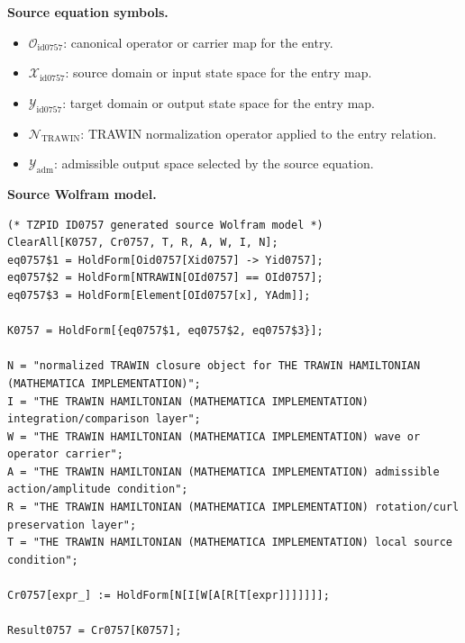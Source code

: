 \begin{minipage}[t]{0.49\linewidth}
\begingroup
\small
\raggedright
\textbf{Source equation symbols.}\par
\begin{itemize}[leftmargin=1.35em,itemsep=1pt,topsep=1pt,parsep=0pt]
    \item $\mathcal{O}_{\mathrm{id0757}}$: canonical operator or carrier map for the entry.
    \item $\mathcal{X}_{\mathrm{id0757}}$: source domain or input state space for the entry map.
    \item $\mathcal{Y}_{\mathrm{id0757}}$: target domain or output state space for the entry map.
    \item $\mathcal{N}_{\mathrm{TRAWIN}}$: TRAWIN normalization operator applied to the entry relation.
    \item $\mathcal{Y}_{\mathrm{adm}}$: admissible output space selected by the source equation.
\end{itemize}
\endgroup
\end{minipage}\hfill
\begin{minipage}[t]{0.47\linewidth}
\begingroup
\scriptsize
\raggedright
\textbf{Source Wolfram model.}\par
\begin{Verbatim}[fontsize=\tiny,breaklines=true,breakanywhere=true]
(* TZPID ID0757 generated source Wolfram model *)
ClearAll[K0757, Cr0757, T, R, A, W, I, N];
eq0757$1 = HoldForm[Oid0757[Xid0757] -> Yid0757];
eq0757$2 = HoldForm[NTRAWIN[OId0757] == OId0757];
eq0757$3 = HoldForm[Element[OId0757[x], YAdm]];

K0757 = HoldForm[{eq0757$1, eq0757$2, eq0757$3}];

N = "normalized TRAWIN closure object for THE TRAWIN HAMILTONIAN (MATHEMATICA IMPLEMENTATION)";
I = "THE TRAWIN HAMILTONIAN (MATHEMATICA IMPLEMENTATION) integration/comparison layer";
W = "THE TRAWIN HAMILTONIAN (MATHEMATICA IMPLEMENTATION) wave or operator carrier";
A = "THE TRAWIN HAMILTONIAN (MATHEMATICA IMPLEMENTATION) admissible action/amplitude condition";
R = "THE TRAWIN HAMILTONIAN (MATHEMATICA IMPLEMENTATION) rotation/curl preservation layer";
T = "THE TRAWIN HAMILTONIAN (MATHEMATICA IMPLEMENTATION) local source condition";

Cr0757[expr_] := HoldForm[N[I[W[A[R[T[expr]]]]]]];

Result0757 = Cr0757[K0757];
\end{Verbatim}
\endgroup
\end{minipage}

